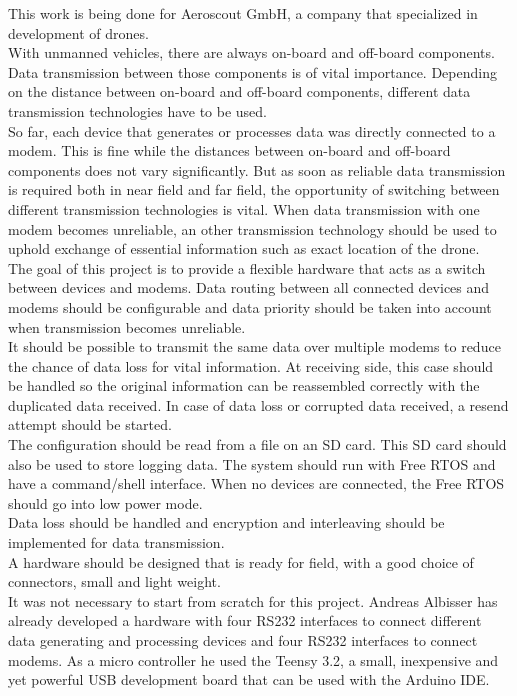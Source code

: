 %
This work is being done for Aeroscout GmbH, a company that specialized in development of drones. \\
With unmanned vehicles, there are always on-board and off-board components. Data transmission between those components is of vital importance. Depending on the distance between on-board and off-board components, different data transmission technologies have to be used. \\
So far, each device that generates or processes data was directly connected to a modem. This is fine while the distances between on-board and off-board components does not vary significantly. But as soon as reliable data transmission is required both in near field and far field, the opportunity of switching between different transmission technologies is vital. When data transmission with one modem becomes unreliable, an other transmission technology should be used to uphold exchange of essential information such as exact location of the drone.\\
The goal of this project is to provide a flexible hardware that acts as a switch between devices and modems. Data routing between all connected devices and modems should be configurable and data priority should be taken into account when transmission becomes unreliable.\\
It should be possible to transmit the same data over multiple modems to reduce the chance of data loss for vital information. At receiving side, this case should be handled so the original information can be reassembled correctly with the duplicated data received. In case of data loss or corrupted data received, a resend attempt should be started.\\
The configuration should be read from a file on an SD card. This SD card should also be used to store logging data. The system should run with Free RTOS and have a command/shell interface. When no devices are connected, the Free RTOS should go into low power mode.\\
Data loss should be handled and encryption and interleaving should be implemented for data transmission.\\
A hardware should be designed that is ready for field, with a good choice of connectors, small and light weight.\\
It was not necessary to start from scratch for this project. Andreas Albisser has already developed a hardware with four RS232 interfaces to connect different data generating and processing devices and four RS232 interfaces to connect modems. As a micro controller he used the Teensy 3.2, a small, inexpensive and yet powerful USB development board that can be used with the Arduino IDE.\\
